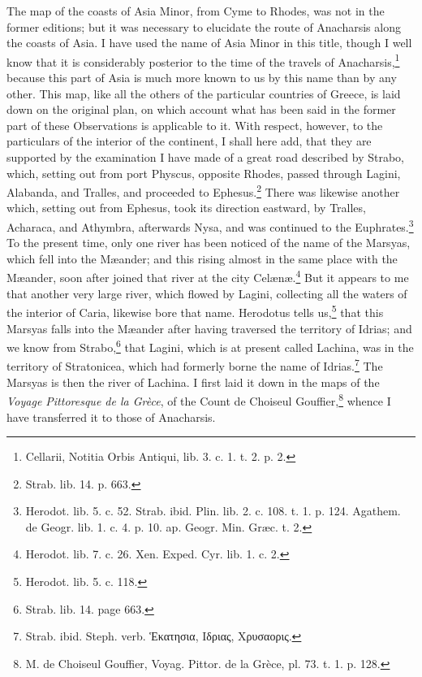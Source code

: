 \documentclass[a4paper, 11pt, oneside, polutonikogreek, english]{article}
\begin{document}
The map of the coasts of Asia Minor, from Cyme to Rhodes, was not in the former editions; but it was necessary to elucidate the route of Anacharsis along the coasts of Asia. I have used the name of Asia Minor in this title, though I well know that it is considerably posterior to the time of the travels of Anacharsis,\footnote{Cellarii, Notitia Orbis Antiqui, lib. 3. c. 1. t. 2. p. 2.} because this part of Asia is much more known to us by this name than by any other. This map, like all the others of the particular countries of Greece, is laid down on the original plan, on which account what has been said in the former part of these Observations is applicable to it. With respect, however, to the particulars of the interior of the continent, I shall here add, that they are supported by the examination I have made of a great road described by Strabo, which, setting out from port Physcus, opposite Rhodes, passed through Lagini, Alabanda, and Tralles, and proceeded to Ephesus.\footnote{Strab. lib. 14. p. 663.} There was likewise another which, setting out from Ephesus, took its direction eastward, by Tralles, Acharaca, and Athymbra, afterwards Nysa, and was continued to the Euphrates.\footnote{Herodot. lib. 5. c. 52. Strab. ibid. Plin. lib. 2. c. 108. t. 1. p. 124. Agathem. de Geogr. lib. 1. c. 4. p. 10. ap. Geogr. Min. Græc. t. 2.} To the present time, only one river has been noticed of the name of the Marsyas, which fell into the Mæander; and this rising almost in the same place with the Mæander, soon after joined that river at the city Celænæ.\footnote{Herodot. lib. 7. c. 26. Xen. Exped. Cyr. lib. 1. c. 2.} But it appears to me that another very large river, which flowed by Lagini, collecting all the waters of the interior of Caria, likewise bore that name. Herodotus tells us,\footnote{Herodot. lib. 5. c. 118.} that this Marsyas falls into the Mæander after having traversed the territory of Idrias; and we know from Strabo,\footnote{Strab. lib. 14. page 663.} that Lagini, which is at present called Lachina, was in the territory of Stratonicea, which had formerly borne the name of Idrias.\footnote{Strab. ibid. Steph. verb. Ἑκατησια, Ιδριας, Χρυσαορις.} The Marsyas is then the river of Lachina. I first laid it down in the maps of the \emph{Voyage Pittoresque de la Grèce}, of the Count de Choiseul Gouffier,\footnote{M. de Choiseul Gouffier, Voyag. Pittor. de la Grèce, pl. 73. t. 1. p. 128.} whence I have transferred it to those of Anacharsis.
\end{document}
